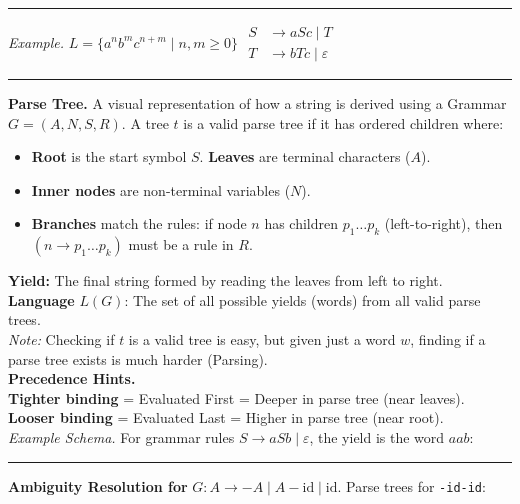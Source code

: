 \documentclass[9pt, a4paper]{extarticle}
\let\oldhrule\hrule
\renewcommand{\hrule}{\vspace{3pt}\oldhrule\vspace{3pt}}
\begin{document}
\begin{minipage}[t]{0.495\textwidth}
{\begin{tabular}{@{}ll|ll@{}}
\bottomrule
\end{tabular}%
}\hrule
\textit{Example.} \( L = \{a^n b^m c^{n+m} \mid n, m \ge 0\} \)
$
\begin{aligned}
S&\to aSc \mid T\\
T&\to bTc \mid \varepsilon
\end{aligned}
$\hrule
\textbf{Parse Tree.} A visual representation of how a string is derived using a Grammar $G = (A, N, S, R)$. A tree $t$ is a valid parse tree if it has ordered children where:
\begin{itemize}[leftmargin=1.2em, itemsep=0pt, topsep=0pt]
\item[-] \textbf{Root} is the start symbol $S$. \textbf{Leaves} are terminal characters ($A$).
\item[-] \textbf{Inner nodes} are non-terminal variables ($N$).
\item[-] \textbf{Branches} match the rules: if node $n$ has children $p_1\dots p_k$ (left-to-right), then $(n \to p_1\dots p_k)$ must be a rule in $R$.
\end{itemize}
\textbf{Yield:} The final string formed by reading the leaves from left to right.\\
\textbf{Language} $L(G)$: The set of all possible yields (words) from all valid parse trees.\\
\textit{Note:} Checking if $t$ is a valid tree is easy, but given just a word $w$, finding if a parse tree exists is much harder (Parsing).\\
\textbf{Precedence Hints.} \\
\textbf{Tighter binding} = Evaluated First = Deeper in parse tree (near leaves). \textbf{Looser binding} = Evaluated Last = Higher in parse tree (near root).\\
\textit{Example Schema.} For grammar rules $S \to aSb \mid \varepsilon$, the yield is the word $aab$:
\begin{center}
\vspace{-4pt}
\vspace{-4pt}
\end{center}
\hrule
\textbf{Ambiguity Resolution for} $G: A \to -A \mid A-\text{id} \mid \text{id}$. Parse trees for \texttt{-id-id}:\\[2pt]

\end{minipage}
\end{document}
